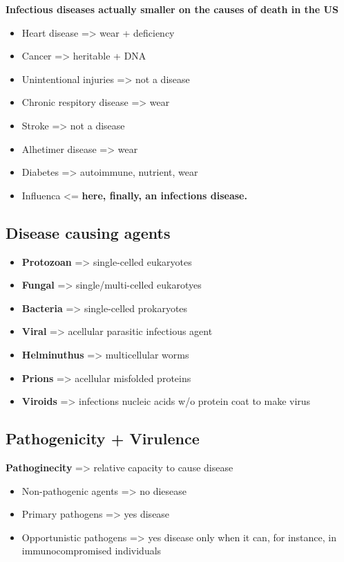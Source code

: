 \documentclass[letterpaper]{article}
\begin{document}
\textbf{Infectious diseases actually smaller on the causes of death in the US}

\begin{itemize}
\item Heart disease => wear + deficiency
\item Cancer => heritable + DNA
\item Unintentional injuries => not a disease
\item Chronic respitory disease => wear
\item Stroke => not a disease
\item Alhetimer disease => wear
\item Diabetes => autoimmune, nutrient, wear
\item Influenca <= \textbf{here, finally, an infections disease.}
\end{itemize}

\subsection{Disease causing agents}
\label{sec:org6d134c3}
\begin{itemize}
\item \textbf{Protozoan} => single-celled eukaryotes
\item \textbf{Fungal} => single/multi-celled eukarotyes
\item \textbf{Bacteria} => single-celled prokaryotes
\item \textbf{Viral} => acellular parasitic infectious agent
\item \textbf{Helminuthus} => multicellular worms
\item \textbf{Prions} => acellular misfolded proteins
\item \textbf{Viroids} => infections nucleic acids w/o protein coat to make virus
\end{itemize}

\subsection{Pathogenicity + Virulence}
\label{sec:org41d6d5d}
\textbf{Pathoginecity} => relative capacity to cause disease

\begin{itemize}
\item Non-pathogenic agents => no diesease
\item Primary pathogens => yes disease
\item Opportunistic pathogens => yes disease only when it can, for instance,
in immunocompromised individuals
\end{itemize}
\end{document}
